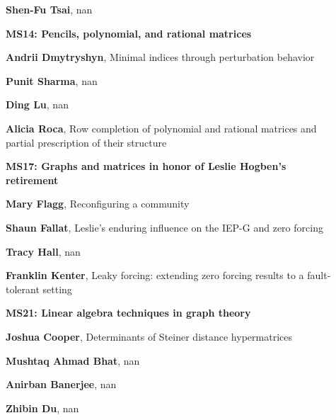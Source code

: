 \documentclass[ILAS2025-program.tex]{subfiles}
\begin{document}
\begin{description}
\begin{description}
        \item[] \textbf{Shen-Fu Tsai}, nan
        \end{description}
    \begin{description}
    \item[] {\color{mstitle}\textbf{MS14: Pencils, polynomial, and rational matrices}} 
    \item[] \textbf{Andrii Dmytryshyn}, Minimal indices through perturbation behavior
        \item[] \textbf{Punit Sharma}, nan
        \item[] \textbf{Ding Lu}, nan
        \item[] \textbf{Alicia Roca}, Row completion of polynomial and rational matrices and partial prescription of their  structure
        \end{description}
    \begin{description}
    \item[] {\color{mstitle}\textbf{MS17: Graphs and matrices in honor of Leslie Hogben's retirement}} 
    \item[] \textbf{Mary Flagg}, Reconfiguring a community
        \item[] \textbf{Shaun Fallat}, Leslie's enduring influence on the IEP-G and zero forcing
        \item[] \textbf{Tracy Hall}, nan
        \item[] \textbf{Franklin Kenter}, Leaky forcing: extending zero forcing results to a fault-tolerant setting
        \end{description}
    \begin{description}
    \item[] {\color{mstitle}\textbf{MS21: Linear algebra techniques in graph theory}} 
    \item[] \textbf{Joshua Cooper}, Determinants of Steiner distance hypermatrices
        \item[] \textbf{Mushtaq Ahmad Bhat}, nan
        \item[] \textbf{Anirban Banerjee}, nan
        \item[] \textbf{Zhibin Du}, nan
        \end{description}

\end{description}
\end{document}
